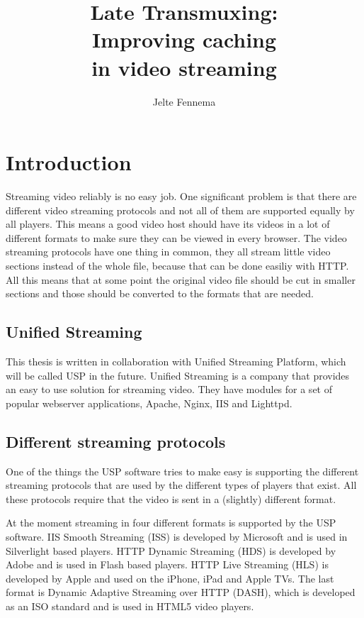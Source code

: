 \documentclass[twoside,openright]{uva-bachelor-thesis}
\title{Late Transmuxing:\\Improving caching \\in video streaming}
\author{Jelte Fennema}
\begin{document}
\maketitle

\begin{abstract}
\end{abstract}


\tableofcontents

\chapter{Introduction}
Streaming video reliably is no easy job. One significant problem is that there
are different video streaming protocols and not all of them are supported
equally by all players. This means a good video host should have its videos in
a lot of different formats to make sure they can be viewed in every browser. The
video streaming protocols have one thing in common, they all stream little video
sections instead of the whole file, because that can be done easiliy with
HTTP\autocite{http}. All this means that at some point the original video file
should be cut in smaller sections and those should be converted to the formats
that are needed.

\section{Unified Streaming}
This thesis is written in collaboration with Unified Streaming Platform, which
will be called USP in the future. Unified Streaming is a company that provides an easy to use
solution for streaming video. They have modules for a set of popular
webserver applications, Apache, Nginx, IIS and Lighttpd.


\section{Different streaming protocols}
One of the things the USP software tries to make easy is supporting the
different streaming protocols that are used by the different types of players
that exist. All these protocols require that the video is sent in a (slightly)
different format.

At the moment streaming in four different formats is supported by the USP
software. IIS Smooth Streaming (ISS) \autocite{smooth} is developed by
Microsoft and is used in Silverlight based players. HTTP Dynamic Streaming (HDS)
\autocite{hds} is developed by Adobe and is used in Flash based players. HTTP Live
Streaming (HLS) \autocite{hls} is developed by Apple and used on the iPhone, iPad
and Apple TVs. The last format is Dynamic Adaptive Streaming over HTTP (DASH),
which is developed as an ISO standard and is used in HTML5 video players.
\end{document}
